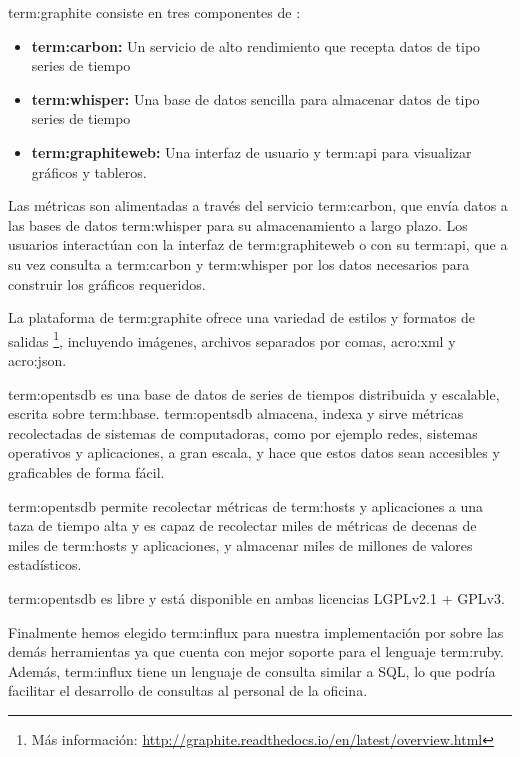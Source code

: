 \gls{term:graphite} consiste en tres componentes de :

\begin{itemize}

  \item \textbf{\gls{term:carbon}:}
  Un servicio de alto rendimiento que recepta datos de tipo series de tiempo

  \item \textbf{\gls{term:whisper}:}
  Una base de datos sencilla para almacenar datos de tipo series de tiempo

  \item \textbf{\gls{term:graphiteweb}:}
  Una interfaz de usuario y \gls{term:api} para visualizar gráficos y tableros.

\end{itemize}

Las métricas son alimentadas a través del servicio \gls{term:carbon}, que envía
datos a las bases de datos \gls{term:whisper} para su almacenamiento a largo
plazo. Los usuarios interactúan con la interfaz de \gls{term:graphiteweb} o con
su \gls{term:api}, que a su vez consulta a \gls{term:carbon} y
\gls{term:whisper} por los datos necesarios para construir los gráficos
requeridos.


La plataforma  de \gls{term:graphite} ofrece una variedad de estilos y
formatos de salidas \footnote{Más información:
\url{http://graphite.readthedocs.io/en/latest/overview.html}},
incluyendo imágenes, archivos separados por comas, \gls{acro:xml} y
\gls{acro:json}.

\gls{term:opentsdb} es una base de datos de series de tiempos distribuida y
escalable, escrita sobre \gls{term:hbase}. \gls{term:opentsdb} almacena, indexa
y sirve métricas recolectadas de sistemas de computadoras, como por ejemplo
redes, sistemas operativos y aplicaciones, a gran escala, y hace que estos
datos sean accesibles y graficables de forma fácil.

\gls{term:opentsdb} permite recolectar métricas de \glspl{term:host} y
aplicaciones a una taza de tiempo alta y es capaz de recolectar miles de
métricas de decenas de miles de \glspl{term:host} y aplicaciones, y almacenar
miles de millones de valores estadísticos.

\gls{term:opentsdb} es  libre y está disponible en ambas licencias
LGPLv2.1 + GPLv3. \cite{opentsdb}

Finalmente hemos elegido \gls{term:influx} para nuestra implementación por
sobre las demás herramientas ya que cuenta con mejor soporte para el lenguaje
\gls{term:ruby}. Además, \gls{term:influx} tiene un lenguaje de consulta similar
a SQL, lo que podría facilitar el desarrollo de consultas al personal de la
oficina.

